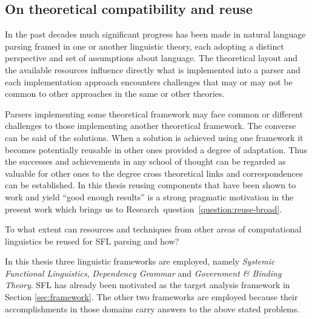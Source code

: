 
\subsection{On theoretical compatibility and reuse}
\label{sec:reuse}
    In the past decades much significant progress has been made in natural language parsing framed in one or another linguistic theory, each adopting a distinct perspective and set of assumptions about language. The theoretical layout and the available resources influence directly what is implemented into a parser and each implementation approach encounters challenges that may or may not be common to other approaches in the same or other theories. 

    Parsers implementing some theoretical framework may face common or different challenges to those implementing another theoretical framework. The converse can be said of the solutions. When a solution is achieved using one framework it becomes potentially reusable in other ones provided a degree of adaptation. Thus the successes and achievements in any school of thought can be regarded as valuable for other ones to the degree cross theoretical links and correspondences can be established. In this thesis reusing components that have been shown to work and yield ``good enough results'' is a strong pragmatic motivation in the present work which brings us to \mbox{Research question \ref{question:reuse-broad}}.

    \begin{question}\label{question:reuse-broad}
        To what extent can resources and techniques from other areas of computational linguistics be reused for SFL parsing and how?
    \end{question}

    In this thesis three linguistic frameworks are employed, namely  \textit{Systemic Functional Linguistics}, \textit{Dependency Grammar} and \textit{Government \& Binding Theory}. SFL has already been motivated as the target analysis framework in Section \ref{sec:framework}. The other two frameworks are employed because their accomplishments in those domains carry answers to the above stated problems. %

